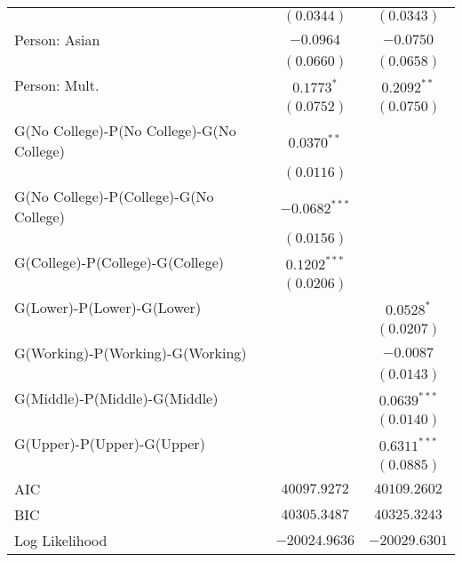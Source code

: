 \begin{center}
\begin{longtable}{l c c}
                                          & $(0.0344)$      & $(0.0343)$     \\
Person: Asian                             & $-0.0964$       & $-0.0750$      \\
                                          & $(0.0660)$      & $(0.0658)$     \\
Person: Mult.                             & $0.1773^{*}$    & $0.2092^{**}$  \\
                                          & $(0.0752)$      & $(0.0750)$     \\
G(No College)-P(No College)-G(No College) & $0.0370^{**}$   &                \\
                                          & $(0.0116)$      &                \\
G(No College)-P(College)-G(No College)    & $-0.0682^{***}$ &                \\
                                          & $(0.0156)$      &                \\
G(College)-P(College)-G(College)          & $0.1202^{***}$  &                \\
                                          & $(0.0206)$      &                \\
G(Lower)-P(Lower)-G(Lower)                &                 & $0.0528^{*}$   \\
                                          &                 & $(0.0207)$     \\
G(Working)-P(Working)-G(Working)          &                 & $-0.0087$      \\
                                          &                 & $(0.0143)$     \\
G(Middle)-P(Middle)-G(Middle)             &                 & $0.0639^{***}$ \\
                                          &                 & $(0.0140)$     \\
G(Upper)-P(Upper)-G(Upper)                &                 & $0.6311^{***}$ \\
                                          &                 & $(0.0885)$     \\
\midrule
AIC                                       & $40097.9272$    & $40109.2602$   \\
BIC                                       & $40305.3487$    & $40325.3243$   \\
Log Likelihood                            & $-20024.9636$   & $-20029.6301$  \\
\end{longtable}
\end{center}

